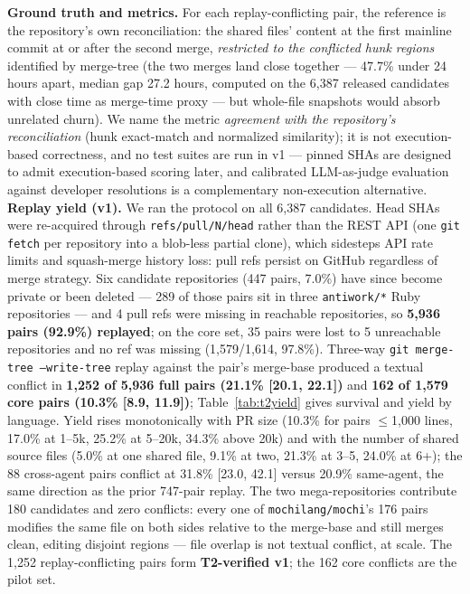 \documentclass{article}
\begin{document}
\textbf{Ground truth and metrics.} For each replay-conflicting pair, the reference is the repository's own reconciliation: the shared files' content at the first mainline commit at or after the second merge, \emph{restricted to the conflicted hunk regions} identified by merge-tree (the two merges land close together --- 47.7\% under 24 hours apart, median gap 27.2 hours, computed on the 6{,}387 released candidates with close time as merge-time proxy --- but whole-file snapshots would absorb unrelated churn). %
We name the metric \emph{agreement with the repository's reconciliation} (hunk exact-match and normalized similarity); it is not execution-based correctness, and no test suites are run in v1 --- pinned SHAs are designed to admit execution-based scoring later, and calibrated LLM-as-judge evaluation against developer resolutions \citep{shen2026javajudge} is a complementary non-execution alternative. \textbf{Replay yield (v1).} We ran the protocol on all 6{,}387 candidates. Head SHAs were re-acquired through \texttt{refs/pull/N/head} rather than the REST API (one \texttt{git fetch} per repository into a blob-less partial clone), which sidesteps API rate limits and squash-merge history loss: pull refs persist on GitHub regardless of merge strategy. Six candidate repositories (447 pairs, 7.0\%) have since become private or been deleted --- 289 of those pairs sit in three \texttt{antiwork/*} Ruby repositories --- and 4 pull refs were missing in reachable repositories, so \textbf{5{,}936 pairs (92.9\%) replayed}; on the core set, 35 pairs were lost to 5 unreachable repositories and no ref was missing (1{,}579/1{,}614, 97.8\%). Three-way \texttt{git merge-tree --write-tree} replay against the pair's merge-base produced a textual conflict in \textbf{1{,}252 of 5{,}936 full pairs (21.1\% [20.1, 22.1])} and \textbf{162 of 1{,}579 core pairs (10.3\% [8.9, 11.9])}; Table~\ref{tab:t2yield} gives survival and yield by language. Yield rises monotonically with PR size (10.3\% for pairs $\leq$1{,}000 lines, 17.0\% at 1--5k, 25.2\% at 5--20k, 34.3\% above 20k) and with the number of shared source files (5.0\% at one shared file, 9.1\% at two, 21.3\% at 3--5, 24.0\% at 6+); the 88 cross-agent pairs conflict at 31.8\% [23.0, 42.1] versus 20.9\% same-agent, the same direction as the prior 747-pair replay. The two mega-repositories contribute 180 candidates and zero conflicts: every one of \texttt{mochilang/mochi}'s 176 pairs modifies the same file on both sides relative to the merge-base and still merges clean, editing disjoint regions --- file overlap is not textual conflict, at scale. The 1{,}252 replay-conflicting pairs form \textbf{T2-verified v1}; the 162 core conflicts are the pilot set.
\end{document}
